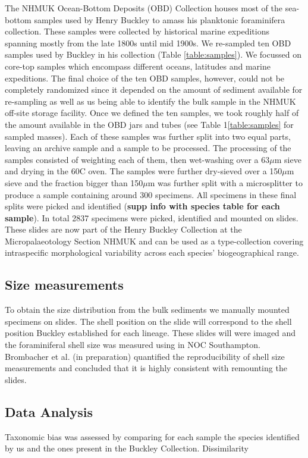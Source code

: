 \documentclass[a4paper]{article}
\begin{document}
The NHMUK Ocean-Bottom Deposits (OBD) Collection houses most of the sea-bottom samples used by Henry Buckley to amass his planktonic foraminifera collection. These samples were collected by historical marine expeditions spanning mostly from the late 1800s until mid 1900s. 
We re-sampled ten OBD samples used by Buckley in his collection (Table \ref{table:samples}). We focussed on core-top samples which encompass different oceans, latitudes and marine expeditions. The final choice of the ten OBD samples, however, could not be completely randomized since it depended on the amount of sediment available for re-sampling as well as us being able to identify the bulk sample in the NHMUK off-site storage facility.
Once we defined the ten samples, we took roughly half of the amount available in the OBD jars and tubes (see Table 1\ref{table:samples} for sampled masses). Each of these samples was further split into two equal parts, leaving an archive sample and a sample to be processed. The processing of the samples consisted of weighting each of them, then wet-washing over a 63$\mu$m sieve and drying in the 60C oven. The samples were further dry-sieved over a 150$\mu$m sieve and the fraction bigger than 150$\mu$m was further split with a microsplitter to produce a sample containing around 300 specimens. All specimens in these final splits were picked and identified (\textbf{supp info with species table for each sample}). In total 2837 specimens were picked, identified and mounted on slides. These slides are now part of the Henry Buckley Collection at the Micropalaeotology Section NHMUK and can be used as a type-collection covering intraspecific morphological variability across each species' biogeographical range. 

	

	\subsection{Size measurements}
	
To obtain the size distribution from the bulk sediments we manually mounted specimens on slides. The shell position on the slide will correspond to the shell position Buckley established for each lineage. These slides will were imaged and the foraminiferal shell size was measured using in NOC Southampton. Brombacher et al. (in preparation) quantified the reproducibility of shell size measurements and concluded that it is highly consistent with remounting the slides.


	\subsection{Data Analysis}
Taxonomic bias was assessed by comparing for each sample the species identified by us and the ones present in the Buckley Collection. Dissimilarity 
	
\end{document}

